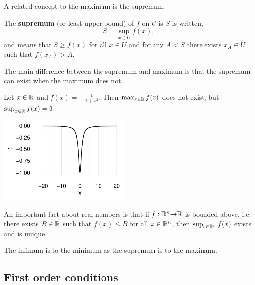 A related concept to the maximum is the supremum.
\begin{definition}
  The \textbf{supremum} (or least upper bound) of $f$ on $U$ is $S$ is
  written,
  \[ S = \sup_{x \in U} f(x), \]
  and means that $S \geq f(x)$ for all $x \in U$ and for any $A < S$
  there exists $x_A \in U$ such that $f(x_A) > A$. 
\end{definition}
The main difference between the supremum and maximum is that the
supremum can exist when the maximum does not.
\begin{example}
  \begin{multicols}{2}
    Let $x \in \mathbb{R}$ and $f(x) = -\frac{1}{1+x^2}$. Then $\max_{x \in \mathbb{R}}
    f(x)$ does not exist, but $\sup_{x \in \mathbb{R}} f(x) = 0$. 
    
    \columnbreak
    
    \includegraphics[width=0.48\textwidth]{ex12}

  \end{multicols}
  
\end{example}
An important fact about real numbers is that if $f:\mathbb{R}^n {\rightarrow} \mathbb{R}$ is
bounded above, i.e. there exists $B \in \mathbb{R}$ such that $f(x) \leq B$
for all $x \in \mathbb{R}^n$, then $\sup_{x \in \mathbb{R}^n} f(x)$ exists and is
unique. 

The infimum is to the minimum as the supremum is to the maximum.

\subsection{First order conditions}

